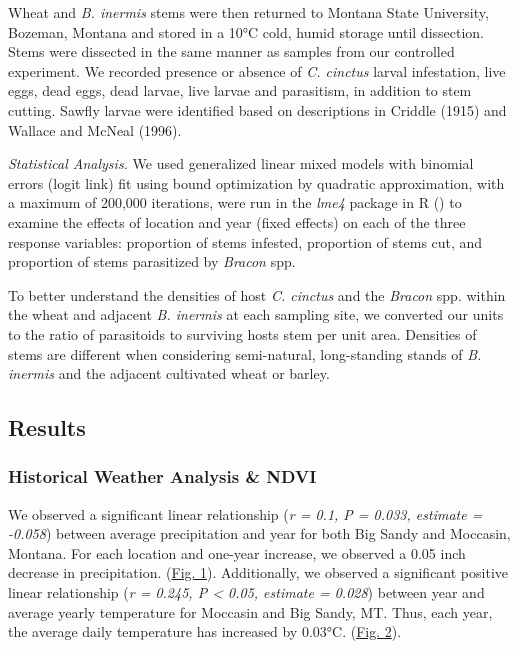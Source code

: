\documentclass[
]{article}
\begin{document}
Wheat and \emph{B. inermis} stems were then returned to Montana State
University, Bozeman, Montana and stored in a 10°C cold, humid storage
until dissection. Stems were dissected in the same manner as samples
from our controlled experiment. We recorded presence or absence of
\emph{C. cinctus} larval infestation, live eggs, dead eggs, dead larvae,
live larvae and parasitism, in addition to stem cutting. Sawfly larvae
were identified based on descriptions in Criddle (1915) and Wallace and
McNeal (1996).

\emph{Statistical Analysis.} We used generalized linear mixed models
with binomial errors (logit link) fit using bound optimization by
quadratic approximation, with a maximum of 200,000 iterations, were run
in the \emph{lme4} package in R ()
to examine the effects of location and year (fixed effects) on each of
the three response variables: proportion of stems infested, proportion
of stems cut, and proportion of stems parasitized by \emph{Bracon} spp.

To better understand the densities of host \emph{C. cinctus} and the
\emph{Bracon} spp. within the wheat and adjacent \emph{B. inermis} at
each sampling site, we converted our units to the ratio of parasitoids
to surviving hosts stem per unit area. Densities of stems are different
when considering semi-natural, long-standing stands of \emph{B. inermis}
and the adjacent cultivated wheat or barley.

\subsection{Results}\label{results}

\subsubsection{Historical Weather Analysis \&
NDVI}\label{historical-weather-analysis-ndvi}

We observed a significant linear relationship (\emph{r = 0.1, P = 0.033,
estimate = -0.058}) between average precipitation and year for both Big
Sandy and Moccasin, Montana. For each location and one-year increase, we
observed a 0.05 inch decrease in precipitation. (\hyperref[figure1]{Fig.
1}). Additionally, we observed a significant positive linear
relationship (\emph{r = 0.245, P \textless{} 0.05, estimate = 0.028})
between year and average yearly temperature for Moccasin and Big Sandy,
MT. Thus, each year, the average daily temperature has increased by
0.03°C. (\hyperref[figure2]{Fig. 2}).
\end{document}
